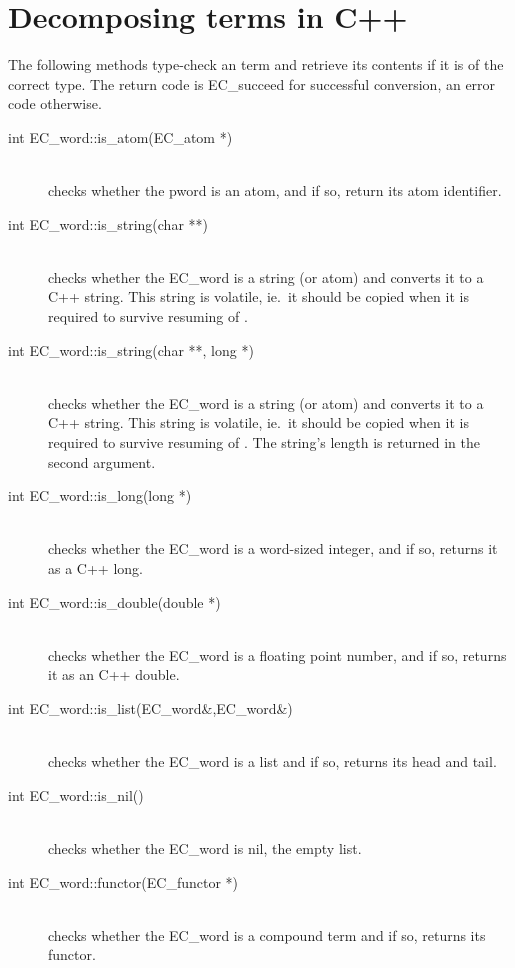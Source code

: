 \section{Decomposing {\eclipse} terms in C++}
The following methods type-check an {\eclipse} term and
retrieve its contents if it is of the correct type.
The return code is EC_succeed for successful conversion,
an error code otherwise.
\begin{description}
\item[int EC_word::is_atom(EC_atom *)]\ \\
	checks whether the {\eclipse} pword is an atom, and if so,
	return its atom identifier.

\item[int EC_word::is_string(char **)]\ \\
	checks whether the EC_word is a string (or atom) and converts
	it to a C++ string. This string is volatile, ie.\ it should be copied
	when it is required to survive resuming of {\eclipse}.

\item[int EC_word::is_string(char **, long *)]\ \\
	checks whether the EC_word is a string (or atom) and converts
	it to a C++ string. This string is volatile, ie.\ it should be copied
	when it is required to survive resuming of {\eclipse}.
	The string's length is returned in the second argument.

\item[int EC_word::is_long(long *)]\ \\
	checks whether the EC_word is a word-sized integer,
	and if so, returns it as a C++ long.

\item[int EC_word::is_double(double *)]\ \\
	checks whether the EC_word is a floating point number,
	and if so, returns it as an C++ double.

\item[int EC_word::is_list(EC_word\&,EC_word\&)]\ \\
	checks whether the EC_word is a list and if so, returns its head and tail.

\item[int EC_word::is_nil()]\ \\
	checks whether the EC_word is nil, the empty list.

\item[int EC_word::functor(EC_functor *)]\ \\
	checks whether the EC_word is a compound term and if so,
	returns its functor.


\end{description}

